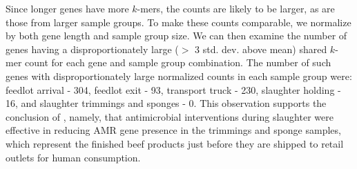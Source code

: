 Since longer genes have more $k$-mers, the counts are likely to be larger, as are those from larger sample groups.  To make these counts comparable, we normalize by both gene length and sample group size.  We can then examine the number of genes having a disproportionately large ($>$ 3 std. dev. above mean) shared $k$-mer count for each gene and sample group combination.  The number of such genes with disproportionately large normalized counts in each sample group were:  feedlot arrival - 304, feedlot exit - 93, transport truck - 230, slaughter holding - 16, and slaughter trimmings and sponges - 0.
This observation supports the conclusion of \cite{noyes2016resistome}, namely, that antimicrobial interventions during slaughter were effective in reducing AMR gene presence in the trimmings and sponge samples, which represent the finished beef products just before they are shipped to retail outlets for human consumption. 
